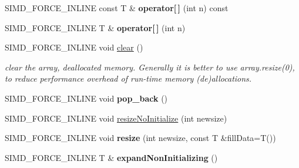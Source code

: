 \begin{DoxyCompactItemize}
\item 
\hypertarget{classbt_aligned_object_array_a43d9bae749c2814e549f0bc7ae649a5d}{S\+I\+M\+D\+\_\+\+F\+O\+R\+C\+E\+\_\+\+I\+N\+L\+I\+N\+E const T \& {\bfseries operator\mbox{[}$\,$\mbox{]}} (int n) const }\label{classbt_aligned_object_array_a43d9bae749c2814e549f0bc7ae649a5d}

\item 
\hypertarget{classbt_aligned_object_array_a29680dc26edbd4691d7b6a43d5a60840}{S\+I\+M\+D\+\_\+\+F\+O\+R\+C\+E\+\_\+\+I\+N\+L\+I\+N\+E T \& {\bfseries operator\mbox{[}$\,$\mbox{]}} (int n)}\label{classbt_aligned_object_array_a29680dc26edbd4691d7b6a43d5a60840}

\item 
\hypertarget{classbt_aligned_object_array_a12123db01dda7758f0df5e3bba10cc0a}{S\+I\+M\+D\+\_\+\+F\+O\+R\+C\+E\+\_\+\+I\+N\+L\+I\+N\+E void \hyperlink{classbt_aligned_object_array_a12123db01dda7758f0df5e3bba10cc0a}{clear} ()}\label{classbt_aligned_object_array_a12123db01dda7758f0df5e3bba10cc0a}

\begin{DoxyCompactList}\small\item\em clear the array, deallocated memory. Generally it is better to use array.\+resize(0), to reduce performance overhead of run-\/time memory (de)allocations. \end{DoxyCompactList}\item 
\hypertarget{classbt_aligned_object_array_a6169be905e03b84ea3bc8d8f7c7fc39d}{S\+I\+M\+D\+\_\+\+F\+O\+R\+C\+E\+\_\+\+I\+N\+L\+I\+N\+E void {\bfseries pop\+\_\+back} ()}\label{classbt_aligned_object_array_a6169be905e03b84ea3bc8d8f7c7fc39d}

\item 
S\+I\+M\+D\+\_\+\+F\+O\+R\+C\+E\+\_\+\+I\+N\+L\+I\+N\+E void \hyperlink{classbt_aligned_object_array_a2cc58c74534181a7a10e5c6ab8b21227}{resize\+No\+Initialize} (int newsize)
\item 
\hypertarget{classbt_aligned_object_array_a6a48cd9cb91d0cfa50ee1c70ef485190}{S\+I\+M\+D\+\_\+\+F\+O\+R\+C\+E\+\_\+\+I\+N\+L\+I\+N\+E void {\bfseries resize} (int newsize, const T \&fill\+Data=T())}\label{classbt_aligned_object_array_a6a48cd9cb91d0cfa50ee1c70ef485190}

\item 
\hypertarget{classbt_aligned_object_array_ad1f99f070780c42619386fd2a4336bec}{S\+I\+M\+D\+\_\+\+F\+O\+R\+C\+E\+\_\+\+I\+N\+L\+I\+N\+E T \& {\bfseries expand\+Non\+Initializing} ()}\label{classbt_aligned_object_array_ad1f99f070780c42619386fd2a4336bec}


\end{DoxyCompactItemize}
